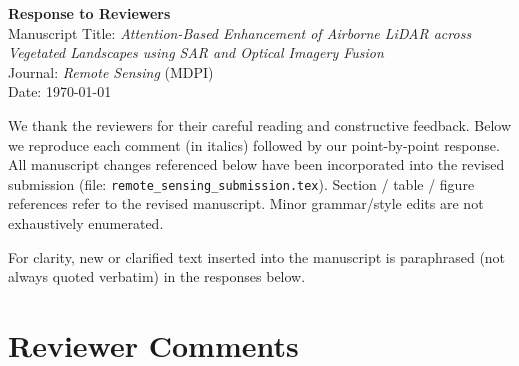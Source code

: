 \documentclass[11pt]{article}
\begin{document}
\begin{center}
{\Large \textbf{Response to Reviewers}}\\[4pt]
Manuscript Title: \emph{Attention-Based Enhancement of Airborne LiDAR across Vegetated Landscapes using SAR and Optical Imagery Fusion}\\[2pt]
Journal: \emph{Remote Sensing} (MDPI)\\[2pt]
Date: \today
\end{center}

We thank the reviewers for their careful reading and constructive feedback. Below we reproduce each comment (in italics) followed by our point-by-point response. All manuscript changes referenced below have been incorporated into the revised submission (file: \texttt{remote\_sensing\_submission.tex}). Section / table / figure references refer to the revised manuscript. Minor grammar/style edits are not exhaustively enumerated.

For clarity, new or clarified text inserted into the manuscript is paraphrased (not always quoted verbatim) in the responses below.

\section*{Reviewer Comments}
\end{document}
